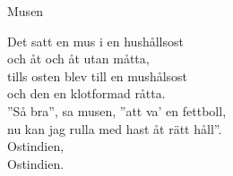 \begin{song}{Musen}
	

	
	
	Det satt en mus i en hushållsost\\
	och åt och åt utan måtta,\\
	tills osten blev till en mushålsost\\
	och den en klotformad råtta.\\
	''Så bra'', sa musen, ''att va' en fettboll,\\
	nu kan jag rulla med hast åt rätt håll''.\\
	Ostindien,\\
	Ostindien.
	
\end{song}
